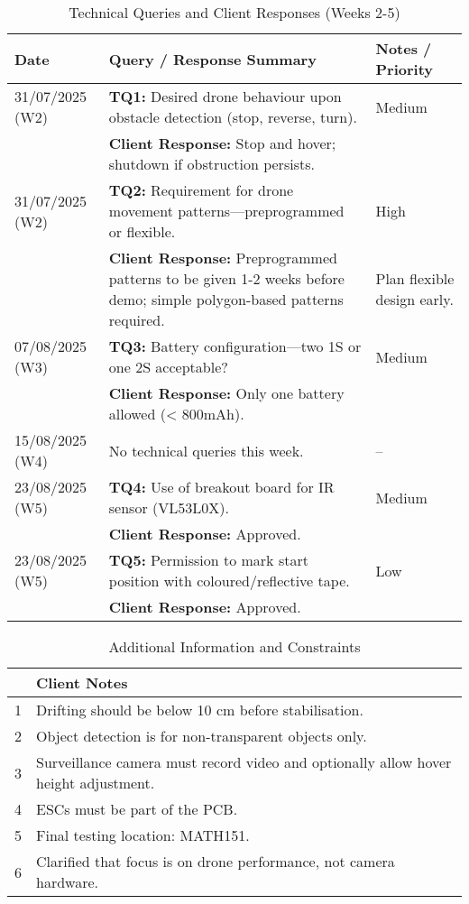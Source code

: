 \begin{table}[H]
\centering
\caption{Technical Queries and Client Responses (Weeks 2-5)}
\begin{tabular}{|p{2cm}|p{8.5cm}|p{2.5cm}|}
\hline
\textbf{Date} & \textbf{Query / Response Summary} & \textbf{Notes / Priority} \\ \hline
31/07/2025 \newline (W2) & \textbf{TQ1:} Desired drone behaviour upon obstacle detection (stop, reverse, turn). & Medium \\ \hline
 & \textbf{Client Response:} Stop and hover; shutdown if obstruction persists. & \\ \hline
31/07/2025 \newline (W2) & \textbf{TQ2:} Requirement for drone movement patterns—preprogrammed or flexible. & High \\ \hline
 & \textbf{Client Response:} Preprogrammed patterns to be given 1-2 weeks before demo; simple polygon-based patterns required. & Plan flexible design early. \\ \hline
07/08/2025 \newline (W3) & \textbf{TQ3:} Battery configuration—two 1S or one 2S acceptable? & Medium \\ \hline
 & \textbf{Client Response:} Only one battery allowed (< 800mAh). & \\ \hline
15/08/2025 \newline (W4) & No technical queries this week. & -- \\ \hline
23/08/2025 \newline (W5) & \textbf{TQ4:} Use of breakout board for IR sensor (VL53L0X). & Medium \\ \hline
 & \textbf{Client Response:} Approved. &  \\ \hline
23/08/2025 \newline (W5) & \textbf{TQ5:} Permission to mark start position with coloured/reflective tape. & Low \\ \hline
 & \textbf{Client Response:} Approved. & \\ \hline
\end{tabular}
\end{table}

\begin{table}[H]
\centering
\caption{Additional Information and Constraints}
\begin{tabular}{|p{0.5cm}|p{13cm}|}
\hline
 & \textbf{Client Notes} \\ \hline
1 & Drifting should be below 10 cm before stabilisation. \\ \hline
2 & Object detection is for non-transparent objects only. \\ \hline
3 & Surveillance camera must record video and optionally allow hover height adjustment. \\ \hline
4 & ESCs must be part of the PCB. \\ \hline
5 & Final testing location: MATH151. \\ \hline
6 & Clarified that focus is on drone performance, not camera hardware. \\ \hline
\end{tabular}
\end{table}

